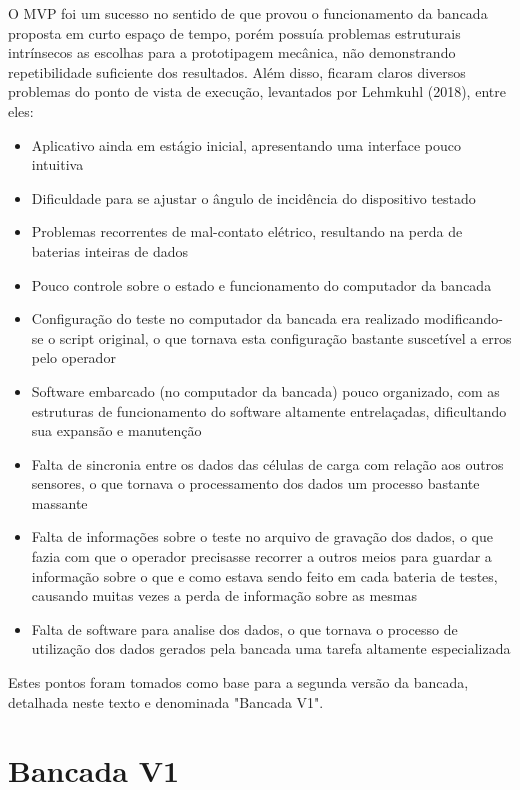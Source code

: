O MVP foi um sucesso no sentido de que provou o funcionamento da bancada proposta em curto espaço de tempo, porém possuía problemas estruturais intrínsecos as escolhas para a prototipagem mecânica, não demonstrando repetibilidade suficiente dos resultados. Além disso, ficaram claros diversos problemas do ponto de vista de execução, levantados por Lehmkuhl (2018), entre eles:

\begin{itemize}
    \item Aplicativo ainda em estágio inicial, apresentando uma interface pouco intuitiva
    \item Dificuldade para se ajustar o ângulo de incidência do dispositivo testado
    \item Problemas recorrentes de mal-contato elétrico, resultando na perda de baterias inteiras de dados
    \item Pouco controle sobre o estado e funcionamento do computador da bancada
    \item Configuração do teste no computador da bancada era realizado modificando-se o script original, o que tornava esta configuração bastante suscetível a erros pelo operador 
    \item Software embarcado (no computador da bancada) pouco organizado, com as estruturas de funcionamento do software altamente entrelaçadas, dificultando sua expansão e manutenção
    \item Falta de sincronia entre os dados das células de carga com relação aos outros sensores, o que tornava o processamento dos dados um processo bastante massante
    \item Falta de informações sobre o teste no arquivo de gravação dos dados, o que fazia com que o operador precisasse recorrer a outros meios para guardar a informação sobre o que e como estava sendo feito em cada bateria de testes, causando muitas vezes a perda de informação sobre as mesmas
    \item Falta de software para analise dos dados, o que tornava o processo de utilização dos dados gerados pela bancada uma tarefa altamente especializada
\end{itemize}

Estes pontos foram tomados como base para a segunda versão da bancada, detalhada neste texto e denominada "Bancada V1".

\section{Bancada V1}

